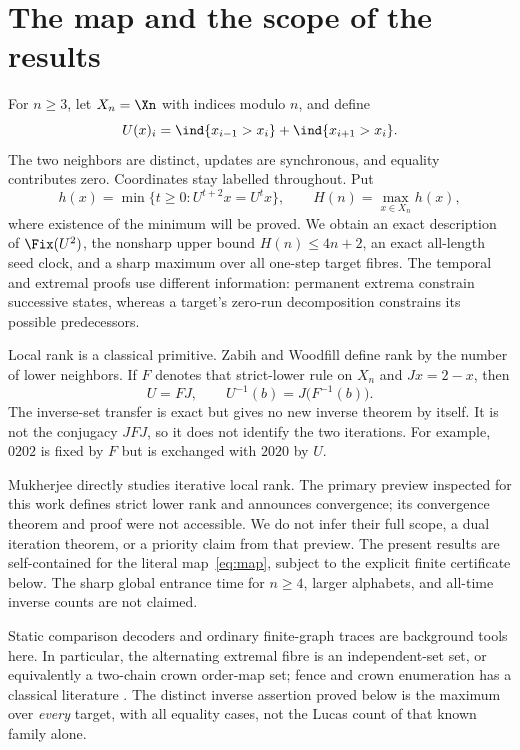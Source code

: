 \section{The map and the scope of the results}

For $n\ge3$, let $X_n=\Xn$ with indices modulo $n$, and define
\begin{equation}\label{eq:map}
 U(x)_i=\ind{x_{i-1}>x_i}+\ind{x_{i+1}>x_i}.
\end{equation}
The two neighbors are distinct, updates are synchronous, and equality
contributes zero. Coordinates stay labelled throughout. Put
\[
 h(x)=\min\{t\ge0:U^{t+2}x=U^t x\},\qquad H(n)=\max_{x\in X_n}h(x),
\]
where existence of the minimum will be proved. We obtain an exact
description of $\Fix(U^2)$, the nonsharp upper bound $H(n)\le4n+2$,
an exact all-length seed clock, and a sharp maximum over all one-step
target fibres. The temporal and extremal proofs use different information:
permanent extrema constrain successive states, whereas a target's
zero-run decomposition constrains its possible predecessors.

Local rank is a classical primitive. Zabih and Woodfill
\citep{zabih1994nonparametric} define rank by the number of lower
neighbors. If $F$ denotes that strict-lower rule on $X_n$ and
$Jx=2-x$, then
\begin{equation}\label{eq:complement}
 U=FJ,\qquad U^{-1}(b)=J\bigl(F^{-1}(b)\bigr).
\end{equation}
The inverse-set transfer is exact but gives no new inverse theorem by
itself. It is not the conjugacy $JFJ$, so it does not identify the two
iterations. For example, $0202$ is fixed by $F$ but is exchanged with
$2020$ by $U$.

Mukherjee \citep{mukherjee2011local} directly studies iterative local
rank. The primary preview inspected for this work defines strict lower
rank and announces convergence; its convergence theorem and proof were
not accessible. We do not infer their full scope, a dual iteration
theorem, or a priority claim from that preview. The present results are
self-contained for the literal map~\eqref{eq:map}, subject to the
explicit finite certificate below. The sharp global entrance time for
$n\ge4$, larger alphabets, and all-time inverse counts are not claimed.

Static comparison decoders and ordinary finite-graph traces are background
tools here. In particular, the alternating extremal fibre is an
independent-set set, or equivalently a two-chain crown order-map set;
fence and crown enumeration has a classical literature
\citep{currie1991number}. The distinct inverse assertion proved below
is the maximum over \emph{every} target, with all equality cases, not
the Lucas count of that known family alone.
